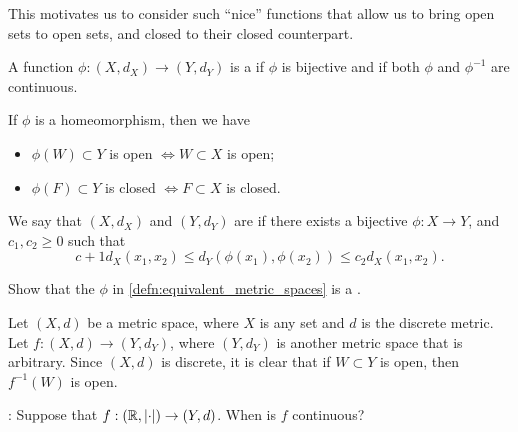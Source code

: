\documentclass[notoc,notitlepage]{tufte-book}
\begin{document}
This motivates us to consider such ``nice'' functions that allow us to bring open sets to open sets, and closed to their closed counterpart.

\begin{defn}[Homeomorphism]\label{defn:homeomorphism}
  A function $\phi : (X, d_X) \to (Y, d_Y)$ is a  if $\phi$ is bijective and if both $\phi$ and $\phi^{-1}$ are continuous.
\end{defn}

\begin{note}
  If $\phi$ is a homeomorphism, then we have
  \begin{itemize}
    \item $\phi(W) \subset Y$ is open $\iff W \subset X$ is open;
  \item $\phi(F) \subset Y$ is closed $\iff F \subset X$ is closed.
  \end{itemize}
\end{note}

\begin{defn}\label{defn:equivalent_metric_spaces}
  We say that $(X, d_X)$ and $(Y, d_Y)$ are  if there exists a bijective $\phi : X \to Y$, and $c_1, c_2 \geq 0$ such that
  \begin{equation*}
    c+1 d_X(x_1, x_2) \leq d_Y(\phi(x_1), \phi(x_2)) \leq c_2 d_X(x_1, x_2).
  \end{equation*}
\end{defn}

\begin{ex}
  Show that the $\phi$ in \cref{defn:equivalent_metric_spaces} is a .
\end{ex}

\begin{eg}
  Let $(X, d)$ be a metric space, where $X$ is any set and $d$ is the discrete metric. Let $f : (X, d) \to (Y, d_Y)$, where $(Y, d_Y)$ is another metric space that is arbitrary. Since $(X, d)$ is discrete, it is clear that if $W \subset Y$ is open, then $f^{-1}(W)$ is open.
\end{eg}

: Suppose that $f : (\mathbb{R}, \left|\cdot\right|) \to (Y, d)$. When is $f$ continuous?
\end{document}
